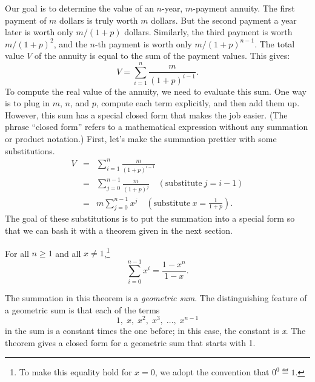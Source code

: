 Our goal is to determine the value of an $n$-year, $m$-payment
annuity.  The first payment of $m$ dollars is truly worth $m$ dollars.
But the second payment a year later is worth only $m/(1+p)$ dollars.
Similarly, the third payment is worth $m/(1+p)^2$, and the $n$-th
payment is worth only $m/(1+p)^{n-1}$.  The total value $V$ of the
annuity is equal to the sum of the payment values.  This gives:
\[
V = \sum_{i=1}^n \frac{m}{(1+p)^{i-1}} .
\]
To compute the real value of the annuity, we need to evaluate this
sum.  One way is to plug in $m$, $n$, and $p$, compute each term
explicitly, and then add them up.  However, this sum has a special
closed form that makes the job easier.  (The phrase ``closed form''
refers to a mathematical expression without any summation or product
notation.)  First, let's make the summation prettier with some
substitutions.
\begin{eqnarray*}
V & = & \sum_{i=1}^n \frac{m}{(1+p)^{i-1}} \\
  & = & \sum_{j=0}^{n-1} \frac{m}{(1+p)^j} \quad (\mbox{substitute} \ j = i-1)\\
  & = & m \sum_{j=0}^{n-1} x^j \quad (\mbox{substitute} \ x = \frac{1}{1+p}).
\end{eqnarray*}
The goal of these substitutions is to put the summation into a special
form so that we can bash it with a theorem given in the next section.


\begin{theorem}
\label{th:seq}
For all $n \geq 1$ and all $x \neq 1$,\footnote{To make this equality
  hold for $x=0$, we adopt the convention that $0^0 \eqdef 1$.}
\[
\sum_{i=0}^{n-1} x^i = \frac{1- x^n}{1 - x}.
\]
\end{theorem}

The summation in this theorem is a {\em geometric sum}.  The
distinguishing feature of a geometric sum is that each of the terms
\[
1,\; x,\; x^2,\; x^3,\; \dots,\; x^{n-1}
\]
in the sum is a constant times the one before; in this case, the constant
is {\em x}.  The theorem gives a closed form for a geometric sum that
starts with 1.

\iffalse

